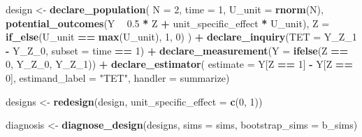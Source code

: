 \documentclass[
]{article}
\newenvironment{Shaded}{\begin{snugshade}}{\end{snugshade}}
\newcommand{\DataTypeTok}[1]{\textcolor[rgb]{0.13,0.29,0.53}{#1}}
\newcommand{\DecValTok}[1]{\textcolor[rgb]{0.00,0.00,0.81}{#1}}
\newcommand{\FloatTok}[1]{\textcolor[rgb]{0.00,0.00,0.81}{#1}}
\newcommand{\KeywordTok}[1]{\textcolor[rgb]{0.13,0.29,0.53}{\textbf{#1}}}
\newcommand{\NormalTok}[1]{#1}
\newcommand{\OperatorTok}[1]{\textcolor[rgb]{0.81,0.36,0.00}{\textbf{#1}}}
\newcommand{\StringTok}[1]{\textcolor[rgb]{0.31,0.60,0.02}{#1}}
\begin{document}
\begin{Shaded}
\begin{Highlighting}[]
\NormalTok{design <-}\StringTok{ }
\StringTok{  }\KeywordTok{declare_population}\NormalTok{(}
    \DataTypeTok{N =} \DecValTok{2}\NormalTok{, }
    \DataTypeTok{time =} \DecValTok{1}\NormalTok{,}
    \DataTypeTok{U_unit =} \KeywordTok{rnorm}\NormalTok{(N),}
    \KeywordTok{potential_outcomes}\NormalTok{(Y }\OperatorTok{~}\StringTok{ }\FloatTok{0.5} \OperatorTok{*}\StringTok{ }\NormalTok{Z }\OperatorTok{+}\StringTok{ }\NormalTok{unit_specific_effect }\OperatorTok{*}\StringTok{ }\NormalTok{U_unit),}
    \DataTypeTok{Z =} \KeywordTok{if_else}\NormalTok{(U_unit }\OperatorTok{==}\StringTok{ }\KeywordTok{max}\NormalTok{(U_unit), }\DecValTok{1}\NormalTok{, }\DecValTok{0}\NormalTok{)}
\NormalTok{  ) }\OperatorTok{+}\StringTok{ }
\StringTok{  }\KeywordTok{declare_inquiry}\NormalTok{(}\DataTypeTok{TET =}\NormalTok{ Y_Z_}\DecValTok{1} \OperatorTok{-}\StringTok{ }\NormalTok{Y_Z_}\DecValTok{0}\NormalTok{, }\DataTypeTok{subset =}\NormalTok{ time }\OperatorTok{==}\StringTok{ }\DecValTok{1}\NormalTok{) }\OperatorTok{+}\StringTok{ }
\StringTok{  }\KeywordTok{declare_measurement}\NormalTok{(}\DataTypeTok{Y =} \KeywordTok{ifelse}\NormalTok{(Z }\OperatorTok{==}\StringTok{ }\DecValTok{0}\NormalTok{, Y_Z_}\DecValTok{0}\NormalTok{, Y_Z_}\DecValTok{1}\NormalTok{)) }\OperatorTok{+}\StringTok{ }
\StringTok{  }\KeywordTok{declare_estimator}\NormalTok{(}
    \DataTypeTok{estimate =}\NormalTok{ Y[Z }\OperatorTok{==}\StringTok{ }\DecValTok{1}\NormalTok{] }\OperatorTok{-}\StringTok{ }\NormalTok{Y[Z }\OperatorTok{==}\StringTok{ }\DecValTok{0}\NormalTok{], }
    \DataTypeTok{estimand_label =} \StringTok{"TET"}\NormalTok{, }\DataTypeTok{handler =}\NormalTok{ summarize)}

\NormalTok{designs <-}\StringTok{ }\KeywordTok{redesign}\NormalTok{(design, }\DataTypeTok{unit_specific_effect =} \KeywordTok{c}\NormalTok{(}\DecValTok{0}\NormalTok{, }\DecValTok{1}\NormalTok{))}
\end{Highlighting}
\end{Shaded}

\begin{Shaded}
\begin{Highlighting}[]
\NormalTok{diagnosis <-}\StringTok{ }\KeywordTok{diagnose_design}\NormalTok{(designs, }\DataTypeTok{sims =}\NormalTok{ sims, }\DataTypeTok{bootstrap_sims =}\NormalTok{ b_sims)}
\end{Highlighting}
\end{Shaded}
\end{document}
